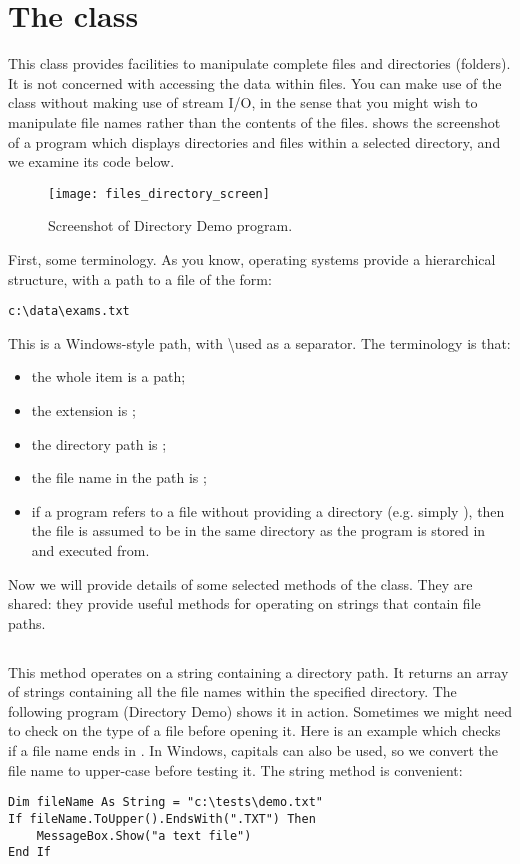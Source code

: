 	\section{The  class}
		This class provides facilities to manipulate complete files and directories (folders). It is not concerned with accessing the data within files. You can make use of the  class without making use of stream I/O, in the sense that you might wish to manipulate file names rather than the contents of the files.  shows the screenshot of a program which displays directories and files within a selected directory, and we examine its code below.
		\begin{figure}[tbh]
			\centering
			\texttt{[image: files\_directory\_screen]}
			\caption{Screenshot of Directory Demo program.}
			\label{fig:files_directory_screen}
		\end{figure}
		
		First, some terminology. As you know, operating systems provide a hierarchical structure, with a path to a file of the form:
		\begin{lstlisting}
c:\data\exams.txt
		\end{lstlisting}
		This is a Windows-style path, with \textbackslash used as a separator. The terminology is that:
		\begin{itemize}
      \item the whole item is a path;
			\item the extension is ;
			\item the directory path is ;
			\item the file name in the path is ;
			\item if a program refers to a file without providing a directory (e.g. simply ), then the file is assumed to be in the same directory as the program is stored in and executed from.
		\end{itemize}
		Now we will provide details of some selected methods of the  class. They are shared: they provide useful methods for operating on strings that contain file paths.

		\subsection*{}
			This method operates on a string containing a directory path. It returns an array of strings containing all the file names within the specified directory. The following program (Directory Demo) shows it in action.
			Sometimes we might need to check on the type of a file before opening it. Here is an example which checks if a file name ends in . In Windows, capitals can also be used, so we convert the file name to upper-case before testing it. The  string method is convenient:
		\begin{lstlisting}
Dim fileName As String = "c:\tests\demo.txt"
If fileName.ToUpper().EndsWith(".TXT") Then
	MessageBox.Show("a text file")
End If
		\end{lstlisting}

